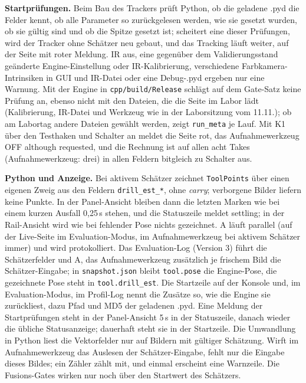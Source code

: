 \documentclass[11pt,a4paper,fleqn]{article}
\newcommand{\code}[1]{\texttt{#1}}
\begin{document}
\textbf{Startprüfungen.} Beim Bau des Trackers prüft Python, ob die geladene .pyd die Felder kennt, ob alle Parameter so
zurückgelesen werden, wie sie gesetzt wurden, ob sie gültig sind und ob die Spitze gesetzt ist; scheitert eine dieser
Prüfungen, wird der Tracker ohne Schätzer neu gebaut, und das Tracking läuft weiter, auf der Seite mit roter Meldung. IR aus, eine gegenüber dem
Validierungsstand geänderte Engine-Einstellung oder IR-Kalibrierung, verschiedene Farbkamera-Intrinsiken in GUI und
IR-Datei oder eine Debug-.pyd ergeben nur eine Warnung. Mit der Engine in \code{cpp/build/Release} schlägt auf dem
Gate-Satz keine Prüfung an, ebenso nicht mit den Dateien, die die Seite im Labor lädt (Kalibrierung, IR-Datei und
Werkzeug wie in der Laborsitzung vom 11.11.); ob am Labortag andere Dateien gewählt werden, zeigt \code{run\_meta} je Lauf. Mit K1 über den Testhaken und Schalter an meldet die Seite rot, das Aufnahmewerkzeug \glqq OFF although
requested\grqq, und die Rechnung ist auf allen acht Takes (Aufnahmewerkzeug: drei) in allen Feldern bitgleich zu
Schalter aus.

\textbf{Python und Anzeige.} Bei aktivem Schätzer zeichnet \code{ToolPoints} über einen eigenen Zweig aus den Feldern
\code{drill\_est\_*}, ohne \emph{carry}; verborgene Bilder liefern keine Punkte. In der Panel-Ansicht bleiben dann
die letzten Marken wie bei einem kurzen Ausfall 0,25\,s stehen, und die Statuszeile meldet \glqq settling\grqq; in
der Rail-Ansicht wird wie bei fehlender Pose nichts gezeichnet. A läuft parallel (auf der Live-Seite im
Evaluation-Modus, im Aufnahmewerkzeug bei aktivem Schätzer immer) und wird protokolliert. Das Evaluation-Log
(Version 3) führt die Schätzerfelder und A, das Aufnahmewerkzeug zusätzlich je frischem Bild die Schätzer-Eingabe; in
\code{snapshot.json} bleibt \code{tool.pose} die Engine-Pose, die gezeichnete Pose steht in \code{tool.drill\_est}.
Die Startzeile auf der Konsole und, im Evaluation-Modus, im Profil-Log nennt die Zusätze so, wie die Engine sie zurückliest, dazu Pfad und
MD5 der geladenen .pyd. Eine Meldung der Startprüfungen steht in der Panel-Ansicht 5\,s in der Statuszeile, danach
wieder die übliche Statusanzeige; dauerhaft steht sie in der Startzeile. Die Umwandlung in Python liest die
Vektorfelder nur auf Bildern mit gültiger Schätzung. Wirft im Aufnahmewerkzeug das Auslesen der Schätzer-Eingabe,
fehlt nur die Eingabe dieses Bildes; ein Zähler zählt mit, und einmal erscheint eine Warnzeile. Die Fusions-Gates
wirken nur noch über den Startwert des Schätzers.
\end{document}

